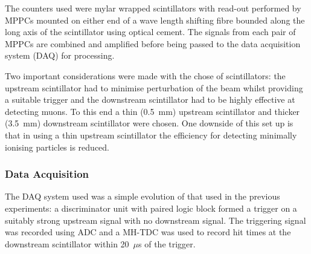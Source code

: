 The counters used were mylar wrapped scintillators with read-out performed by MPPCs mounted on either end of a wave length shifting fibre bounded along the long axis of the scintillator using optical cement. The signals from each pair of MPPCs are combined and amplified before being passed to the data acquisition system (DAQ) for processing.

Two important considerations were made with the chose of scintillators: the upstream scintillator had to minimise perturbation of the beam whilst providing a suitable trigger and the downstream scintillator had to be highly effective at detecting muons. To this end a thin (0.5~mm) upstream scintillator and thicker (3.5~mm) downstream scintillator were chosen. One downside of this set up is that in using a thin upstream scintillator the efficiency for detecting minimally ionising particles is reduced.

\subsubsection{Data Acquisition} %
\label{sub:data_acquisition}
The DAQ system used was a simple evolution of that used in the previous experiments: a discriminator unit with paired logic block formed a trigger on a suitably strong upstream signal with no downstream signal. The triggering signal was recorded using ADC and a MH-TDC was used to record hit times at the downstream scintillator within 20~\( \mu \)s of the trigger.

% 
% 

